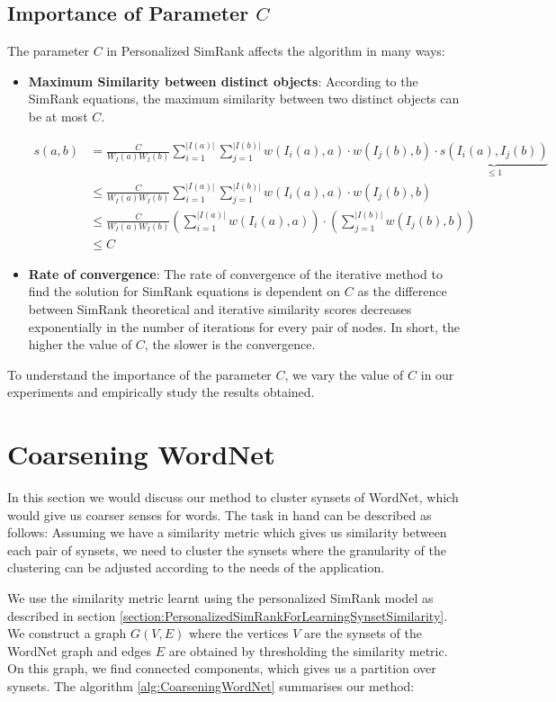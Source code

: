 \subsection{Importance of Parameter \texorpdfstring{$C$}{TEXT} }
The parameter $C$ in Personalized SimRank affects the algorithm in many ways:
\begin{itemize}
\item \textbf{Maximum Similarity between distinct objects}: According to the SimRank equations, the maximum similarity between two distinct objects can be at most $C$.

\begin{align}
s(a,b) &= \frac{C}{W_{I}(a)W_{I}(b)} \sum_{i=1}^{|I(a)|} \sum_{j=1}^{|I(b)|} w(I_i(a),a)  \cdot w(I_j(b),b) \cdot \underbrace{s(I_i(a),I_j(b))}_{\leq 1}\\
&\leq \frac{C}{W_{I}(a)W_{I}(b)} \sum_{i=1}^{|I(a)|} \sum_{j=1}^{|I(b)|} w(I_i(a),a)  \cdot w(I_j(b),b)\\
&\leq \frac{C}{W_{I}(a)W_{I}(b)} \left( \sum_{i=1}^{|I(a)|} w(I_i(a),a) \right )  \cdot \left( \sum_{j=1}^{|I(b)|}  w(I_j(b),b) \right )\\
&\leq C
\end{align}

\item \textbf{Rate of convergence}: The rate of convergence of the iterative method to find the solution for SimRank equations is dependent on $C$ as the difference between SimRank theoretical and iterative similarity scores decreases exponentially in the number of iterations for every pair of nodes. In short, the higher the value of $C$, the slower is the convergence.
\end{itemize}

To understand the importance of the parameter $C$, we vary the value of $C$ in our experiments and empirically study the results obtained.

\section{Coarsening WordNet}
In this section we would discuss our method to cluster synsets of WordNet, which would give us coarser senses for words. The task in hand can be described as follows: Assuming we have a similarity metric which gives us similarity between each pair of synsets, we need to cluster the synsets where the granularity of the clustering can be adjusted according to the needs of the application.

We use the similarity metric learnt using the personalized SimRank model as described in section \ref{section:PersonalizedSimRankForLearningSynsetSimilarity}.
We construct a graph $G(V,E)$ where the vertices $V$ are the synsets of the WordNet graph and edges $E$ are obtained by thresholding the similarity metric.
On this graph, we find connected components, which gives us a partition over synsets.
The algorithm \ref{alg:CoarseningWordNet} summarises our method:

